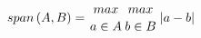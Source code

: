 \begin{equation}
 \begin{aligned}
 span\left( A,B \right) = {max \atop {a \in A }} {max \atop {b \in B}} \left| a-b \right|\label{eqn:span} 
\end{aligned}
\end{equation}
